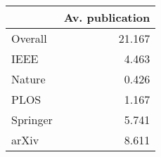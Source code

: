 \begin{tabular}{lr}
\toprule
{} &  Av. publication \\
\midrule
Overall  &           21.167 \\
IEEE     &            4.463 \\
Nature   &            0.426 \\
PLOS     &            1.167 \\
Springer &            5.741 \\
arXiv    &            8.611 \\
\bottomrule
\end{tabular}
